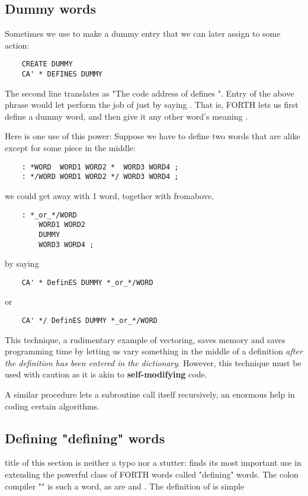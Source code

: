 \subsection{Dummy words}
Sometimes we use  to make a dummy entry that we can later assign to some action:
\begin{lstlisting}
    CREATE DUMMY
    CA' * DEFINES DUMMY
\end{lstlisting}

The second line translates as "The code address of \bc{*} defines ". Entry of the above phrase would let  perform the job of \bc{*} just by saying . That is, FORTH lets us first define a dummy word, and then give it any other word’s meaning .

Here is one use of this power: Suppose we have to define two words that are alike except for some piece in the middle:
\begin{lstlisting}
    : *WORD  WORD1 WORD2 *  WORD3 WORD4 ;
    : */WORD WORD1 WORD2 */ WORD3 WORD4 ;
\end{lstlisting}

we could get away with 1 word, together with  fromabove,

\begin{lstlisting}
    : *_or_*/WORD
        WORD1 WORD2
        DUMMY
        WORD3 WORD4 ;
\end{lstlisting}
by saying
\begin{lstlisting}
    CA' * DefinES DUMMY *_or_*/WORD
\end{lstlisting}
or
\begin{lstlisting}
    CA' */ DefinES DUMMY *_or_*/WORD
\end{lstlisting}

This technique, a rudimentary example of vectoring, saves memory and saves programming time by letting us vary something in the middle of a definition \textit{after the definition has been entered in the dictionary}. However, this technique must be used with caution as it is akin to \textbf{self-modifying} code.

A similar procedure lets a subroutine call itself recursively, an enormous help in coding certain algorithms.

\subsection{Defining "defining" words}

 title of this section is neither a typo nor a stutter:  finds its most important use in extending the powerful class of FORTH words called "defining" words. The colon compiler "\bc{:}" is such a word, as are  and . The definition of  is simple

